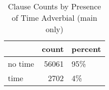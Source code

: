 \begin{table}[htbp!]
\centering
\caption{Clause Counts by Presence of Time Adverbial (main only)}
\label{table:main_cp}
\begin{tabular}{lrl}
\toprule
{} &  count & percent \\
\midrule
no time &  56061 &     95\% \\
time    &   2702 &      4\% \\
\bottomrule
\end{tabular}
\end{table}
